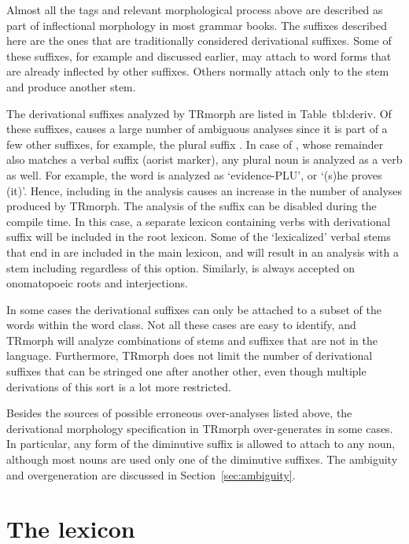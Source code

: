 \documentclass[twocolumn]{article}
\begin{document}
Almost all the tags and relevant morphological process above are
described as part of inflectional morphology in most grammar books.
The suffixes described here are the ones that are traditionally
considered derivational suffixes. Some of these suffixes, for example
 and  discussed earlier, may attach to word forms
that are already inflected by other suffixes. Others normally attach
only to the stem and produce another stem.

The derivational suffixes analyzed by TRmorph are listed in Table~{tbl:deriv}.
Of these suffixes,  causes a large number of ambiguous analyses 
since it is part of a few other suffixes, 
for example, the plural suffix .
In case of , whose remainder  also matches a verbal suffix (aorist marker),
any plural noun is analyzed as a verb as well.
For example, the word  is analyzed as  `evidence-PLU', or  `(s)he proves (it)'.
Hence, including  in the analysis causes an increase in the number of analyses produced by TRmorph.
The analysis of the suffix  can be disabled during the compile time.
In this case, a separate lexicon containing verbs with derivational suffix  will be included in the root lexicon.
Some of the `lexicalized' verbal stems that end in  are included in the main lexicon,
and will result in an analysis with a stem including  regardless of this option.
Similarly,  is always accepted on onomatopoeic roots and interjections.

In some cases the derivational suffixes can only be attached to a subset of the words within the word class.
Not all these cases are easy to identify, 
and TRmorph will analyze combinations of stems and suffixes that are not in the language.
Furthermore, TRmorph does not limit the number of derivational suffixes that can be stringed one after another other, 
even though multiple derivations of this sort is a lot more restricted. 

Besides the sources of possible erroneous over-analyses listed above,
the derivational morphology specification in TRmorph over-generates in
some cases. In particular, any form of the diminutive suffix is
allowed to attach to any noun, although most nouns are used only one
of the diminutive suffixes. The ambiguity and overgeneration are
discussed in Section~\ref{sec:ambiguity}.


\section{\label{sec:lexicon}The lexicon}
\end{document}
